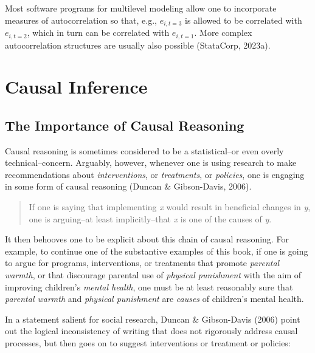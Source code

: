 \documentclass[
  letterpaper,
  DIV=11,
  numbers=noendperiod]{scrreprt}
\begin{document}
Most software programs for multilevel modeling allow one to incorporate
measures of autocorrelation so that, e.g., \(e_{i,t=3}\) is allowed to
be correlated with \(e_{i,t=2}\), which in turn can be correlated with
\(e_{i,t=1}\). More complex autocorrelation structures are usually also
possible (StataCorp, 2023a).

\section{Causal Inference}\label{sec-causality}

\subsection{The Importance of Causal
Reasoning}\label{the-importance-of-causal-reasoning}

Causal reasoning is sometimes considered to be a statistical--or even
overly technical--concern. Arguably, however, whenever one is using
research to make recommendations about \emph{interventions}, or
\emph{treatments}, or \emph{policies}, one is engaging in some form of
causal reasoning (Duncan \& Gibson-Davis, 2006). 

\begin{quote}
If one is saying that implementing \emph{x} would result in beneficial
changes in \emph{y}, one is arguing--at least implicitly--that \emph{x}
is one of the causes of \emph{y}.
\end{quote}

It then behooves one to be explicit about this chain of causal
reasoning. For example, to continue one of the substantive examples of
this book, if one is going to argue for programs, interventions, or
treatments that promote \emph{parental warmth}, or that discourage
parental use of \emph{physical punishment} with the aim of improving
children's \emph{mental health}, one must be at least reasonably sure
that \emph{parental warmth} and \emph{physical punishment} are
\emph{causes} of children's mental health.

In a statement salient for social research, Duncan \& Gibson-Davis
(2006) point out the logical inconsistency of writing that does not
rigorously address causal processes, but then goes on to suggest
interventions or treatment or policies:
\end{document}
